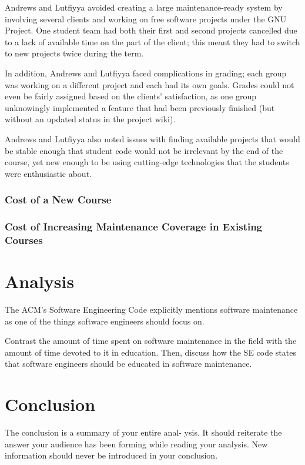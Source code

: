 \documentclass[11pt]{article}
\begin{document}
\begin{multicols}{2}
Andrews and Lutfiyya avoided creating a large maintenance-ready system by involving several clients and working on free software projects under the GNU Project.  One student team had both their first and second projects cancelled due to a lack of available time on the part of the client; this meant they had to switch to new projects twice during the term. \cite{Andrews:2000:ERS:794188.794320}

In addition, Andrews and Lutfiyya faced complications in grading; each group was working on a different project and each had its own goals. \cite{Andrews:2000:ERS:794188.794320}  Grades could not even be fairly assigned based on the clients' satisfaction, as one group unknowingly implemented a feature that had been previously finished (but without an updated status in the project wiki). \cite{Andrews:2000:ERS:794188.794320}

Andrews and Lutfiyya also noted issues with finding available projects that would be stable enough that student code would not be irrelevant by the end of the course, yet new enough to be using cutting-edge technologies that the students were enthusiastic about. \cite{Andrews:2000:ERS:794188.794320}


\subsubsection{Cost of a New Course}

\subsubsection{Cost of Increasing Maintenance Coverage in Existing Courses}

\section{Analysis}

The ACM's Software Engineering Code explicitly mentions software maintenance as one of the things software engineers should focus on. \cite{secode}

Contrast the amount of time spent on software maintenance in the field with the amount of time devoted to it in education.  Then, discuss how the SE code states that software engineers should be educated in software maintenance.

\section{Conclusion}
The conclusion is a summary of your entire anal- ysis. It should reiterate the answer your audience has been forming while reading your analysis. New information should never be introduced in your conclusion. \cite{texTemp}

\end{multicols}
\newpage

\nocite{*}




\end{document}
